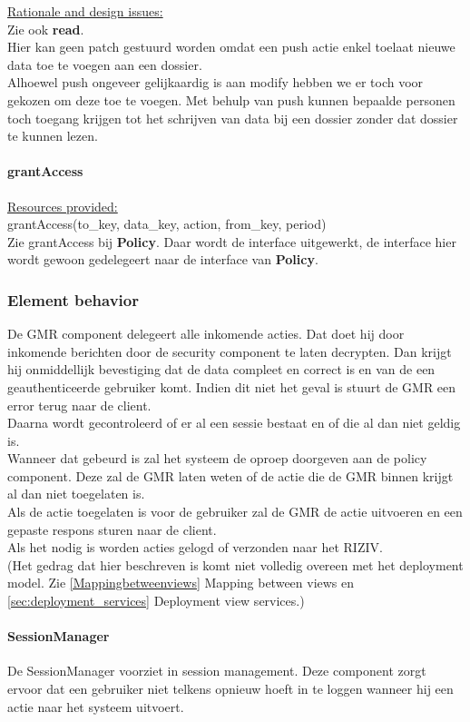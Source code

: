\documentclass[a4paper,10pt]{article}
\begin{document}
\underline{Rationale and design issues:}\\
Zie ook \textbf{read}.\\
Hier kan geen patch gestuurd worden omdat een push actie enkel toelaat nieuwe data toe te voegen aan een dossier.\\
Alhoewel push ongeveer gelijkaardig is aan modify hebben we er toch voor gekozen om deze toe te voegen.  Met behulp van push kunnen bepaalde personen toch toegang krijgen tot het schrijven van data bij een dossier zonder dat dossier te kunnen lezen.

\paragraph{grantAccess}
\underline{Resources provided:}\\
grantAccess(to\_key, data\_key, action, from\_key, period)\\
Zie grantAccess bij \textbf{Policy}.  Daar wordt de interface uitgewerkt, de interface hier wordt gewoon gedelegeert naar de interface van \textbf{Policy}.

\subsubsection{Element behavior}
De GMR component delegeert alle inkomende acties.  Dat doet hij door inkomende berichten door de security component te laten decrypten.  Dan krijgt hij onmiddellijk bevestiging dat de data compleet en correct is en van de een geauthenticeerde gebruiker komt.  Indien dit niet het geval is stuurt de GMR een error terug naar de client.\\
Daarna wordt gecontroleerd of er al een sessie bestaat en of die al dan niet geldig is.\\
Wanneer dat gebeurd is zal het systeem de oproep doorgeven aan de policy component.  Deze zal de GMR laten weten of de actie die de GMR binnen krijgt al dan niet toegelaten is.\\
Als de actie toegelaten is voor de gebruiker zal de GMR de actie uitvoeren en een gepaste respons sturen naar de client.\\
Als het nodig is worden acties gelogd of verzonden naar het RIZIV.\\
(Het gedrag dat hier beschreven is komt niet volledig overeen met het deployment model.  Zie \ref{Mappingbetweenviews} Mapping between views en \ref{sec:deployment_services} Deployment view services.)


\paragraph{SessionManager}
De SessionManager voorziet in session management.  Deze component zorgt ervoor dat een gebruiker niet telkens opnieuw hoeft in te loggen wanneer hij een actie naar het systeem uitvoert.
\end{document}
